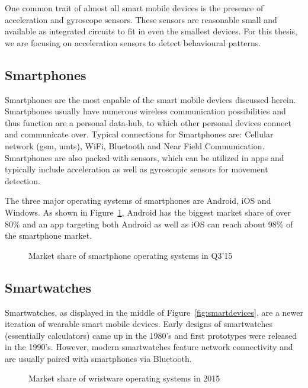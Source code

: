 One common trait of almost all smart mobile devices is the presence of acceleration and gyroscope sensors. These sensors are reasonable small and available as integrated circuits to fit in even the smallest devices. For this thesis, we are focusing on acceleration sensors to detect behavioural patterns.

\subsection{Smartphones}
Smartphones are the most capable of the smart mobile devices discussed herein. Smartphones usually have numerous wireless communication possibilities and thus function are a personal data-hub, to which other personal devices connect and communicate over. Typical connections for Smartphones are: Cellular network (\eg \acrshort{gsm}, \acrshort{umts}), WiFi, Bluetooth and Near Field Communication. Smartphones are also packed with sensors, which can be utilized in \glspl{app} and typically include acceleration as well as gyroscopic sensors for movement detection.

The three major operating systems of smartphones are Android, iOS and Windows. As shown in Figure~\ref{fig:smartphoneosmarketshare}, Android has the biggest market share of over 80\% and an \gls{app} targeting both Android as well as iOS can reach about 98\% of the smartphone market.

\begin{figure}
    \centering
    
    \caption{Market share of smartphone operating systems in Q3'15 \cite{gartner2015smartosmarketshare}}
    \label{fig:smartphoneosmarketshare}
\end{figure}

\subsection{Smartwatches}
Smartwatches, as displayed in the middle of Figure~\ref{fig:smartdevices}, are a newer iteration of wearable smart mobile devices. Early designs of smartwatches (essentially calculators) came up in the 1980's and first prototypes were released in the 1990's. However, modern smartwatches feature network connectivity and are usually paired with smartphones via Bluetooth.

\begin{figure}
    \centering
    
    \caption{Market share of wristware operating systems in 2015 \cite{idc2015wristmarketshare}}
    \label{fig:watchmarketshare}
\end{figure}

